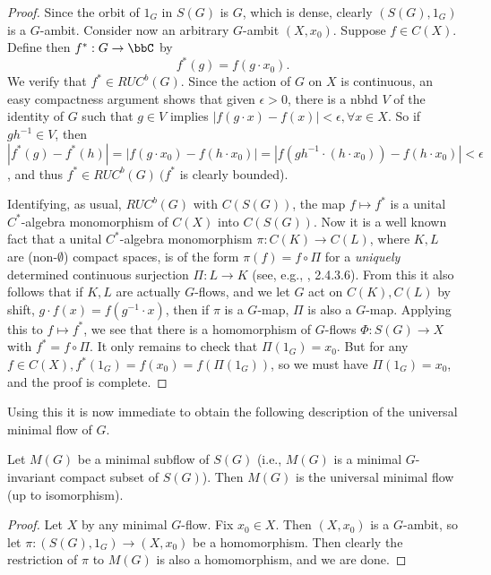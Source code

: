 \begin{proof}
    Since the orbit of $1_G$ in $S(G)$ is $G$, which is dense,
    clearly $(S(G),1_G)$ is a $G$-ambit.  Consider now an arbitrary $G$-ambit
    $(X,x_0)$.  Suppose $f\in C(X)$.  Define then $f^*:G\rightarrow\bbC$ by
    \[
        f^*(g)=f(g\cdot x_0).
    \]
    We verify that $f^*\in RUC^b(G)$.  Since the action of $G$ on $X$
    is continuous, an easy compactness argument shows that given $\epsilon >0$,
    there is a nbhd $V$ of the identity of $G$ such that $g\in V$ implies
    $|f(g\cdot x)-f(x)|<\epsilon ,\forall x\in X$.  So if $gh^{-1}\in V$, then
    $|f^*(g)-f^*(h)|=|f(g\cdot x_0)-f(h\cdot x_0)|=|f(gh^{-1}\cdot (h\cdot x_0))
        -f(h\cdot x_0)|<\epsilon$, and thus $f^*\in RUC^b(G)\ (f^*$ is clearly
    bounded).

    Identifying, as usual, $RUC^b(G)$ with $C(S(G))$, the map $f\mapsto
        f^*$ is a unital $C^*$-algebra monomorphism of $C(X)$ into $C(S(G))$.
    Now it is a well known fact that a unital $C^*$-algebra monomorphism
    $\pi :C(K)\rightarrow C(L)$, where $K,L$ are (non-$\emptyset$) compact
    spaces, is of the form $\pi (f)=f\circ\Pi$ for a {\it uniquely}
    determined continuous surjection $\Pi :L\rightarrow K$ (see, e.g.,
    \cite{Co}, 2.4.3.6).  From this it also follows that if $K,L$
    are actually $G$-flows, and we let $G$ act on $C(K),C(L)$ by shift,
    $g\cdot f(x)=f(g^{-1}\cdot x)$, then if $\pi$ is a $G$-map, $\Pi$ is
    also a $G$-map.  Applying this to $f\mapsto f^*$, we see that there is a
    homomorphism of $G$-flows $\Phi :S(G)\rightarrow X$ with $f^*=f\circ\Pi$.
    It only remains to check that $\Pi (1_G)=x_0$.  But for any $f\in C(X),
        f^*(1_G)=f(x_0)=f(\Pi (1_G))$, so we must have $\Pi (1_G)=x_0$, and
    the proof is complete.
\end{proof}

Using this it is now immediate to obtain the following description of the
universal minimal flow of $G$.

\begin{corollary}
    \label{1.4}
    Let $M(G)$ be a minimal subflow of
    $S(G)$ (i.e., $M(G)$ is a minimal $G$-invariant compact subset of $S(G)$).
    Then $M(G)$ is the universal minimal flow (up to isomorphism).
\end{corollary}

\begin{proof}
    Let $X$ by any minimal $G$-flow.  Fix $x_0\in X$.  Then
    $(X,x_0)$ is a $G$-ambit, so let $\pi :(S(G), 1_G)\rightarrow (X,x_0)$
    be a homomorphism.  Then clearly the restriction of $\pi$ to $M(G)$ is also
    a homomorphism, and we are done.
\end{proof}

